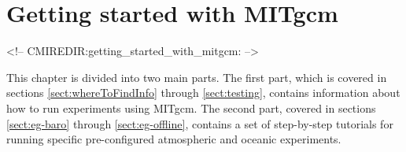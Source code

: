 
\chapter[Getting Started with MITgcm]{Getting started with MITgcm}
\label{chap:getting_started}

\begin{rawhtml}
<!-- CMIREDIR:getting_started_with_mitgcm: -->
\end{rawhtml}

This chapter is divided into two main parts. The first part, which is
covered in sections \ref{sect:whereToFindInfo} through
\ref{sect:testing}, contains information about how to run experiments
using MITgcm. The second part, covered in sections
\ref{sect:eg-baro} through \ref{sect:eg-offline}, contains a set of
step-by-step tutorials for running specific pre-configured atmospheric
and oceanic experiments.



\newpage


\newpage


